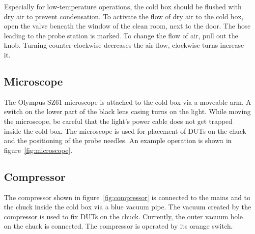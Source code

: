 \documentclass[a4paper]{article}
\begin{document}
Especially for low-temperature operations, the cold box should be flushed with dry air to prevent condensation.
To activate the flow of dry air to the cold box, open the valve beneath the window of the clean room, next to the door.
The hose leading to the probe station is marked.
To change the flow of air, pull out the knob.
Turning counter-clockwise decreases the air flow, clockwise turns increase it.\\

\subsection{Microscope}
\label{sec:microscope}

The Olympus SZ61 microscope is attached to the cold box via a moveable arm.
A switch on the lower part of the black lens casing turns on the light.
While moving the microscope, be careful that the light's power cable does not get trapped inside the cold box.
The microscope is used for placement of DUTs on the chuck and the positioning of the probe needles.
An example operation is shown in figure~\ref{fig:microscope}.\\

\subsection{Compressor}
\label{sec:compressor}

The compressor shown in figure~\ref{fig:compressor} is connected to the mains and to the chuck inside the cold box via a blue vacuum pipe.
The vacuum created by the compressor is used to fix DUTs on the chuck.
Currently, the outer vacuum hole on the chuck is connected.
The compressor is operated by its orange switch.\\
\end{document}
